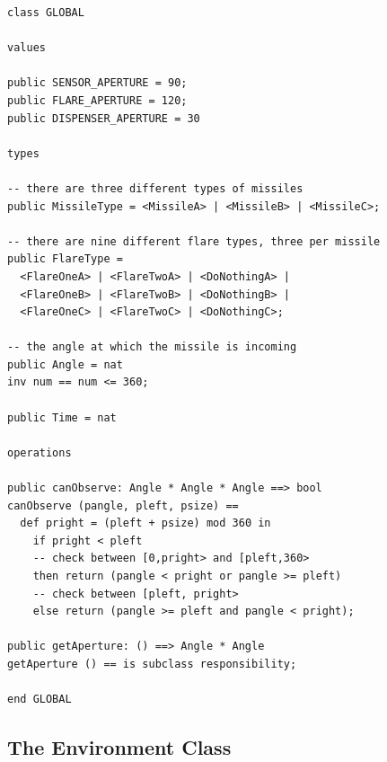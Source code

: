 \documentclass{overturerepchap}
\begin{document}
\begin{lstlisting}
class GLOBAL

values

public SENSOR_APERTURE = 90;
public FLARE_APERTURE = 120;
public DISPENSER_APERTURE = 30

types

-- there are three different types of missiles
public MissileType = <MissileA> | <MissileB> | <MissileC>;

-- there are nine different flare types, three per missile
public FlareType =
  <FlareOneA> | <FlareTwoA> | <DoNothingA> | 
  <FlareOneB> | <FlareTwoB> | <DoNothingB> | 
  <FlareOneC> | <FlareTwoC> | <DoNothingC>;

-- the angle at which the missile is incoming
public Angle = nat
inv num == num <= 360;

public Time = nat

operations

public canObserve: Angle * Angle * Angle ==> bool
canObserve (pangle, pleft, psize) ==
  def pright = (pleft + psize) mod 360 in
    if pright < pleft
    -- check between [0,pright> and [pleft,360>
    then return (pangle < pright or pangle >= pleft)
    -- check between [pleft, pright>
    else return (pangle >= pleft and pangle < pright);
       
public getAperture: () ==> Angle * Angle
getAperture () == is subclass responsibility;

end GLOBAL
\end{lstlisting}

\subsection{The Environment Class}
\end{document}
